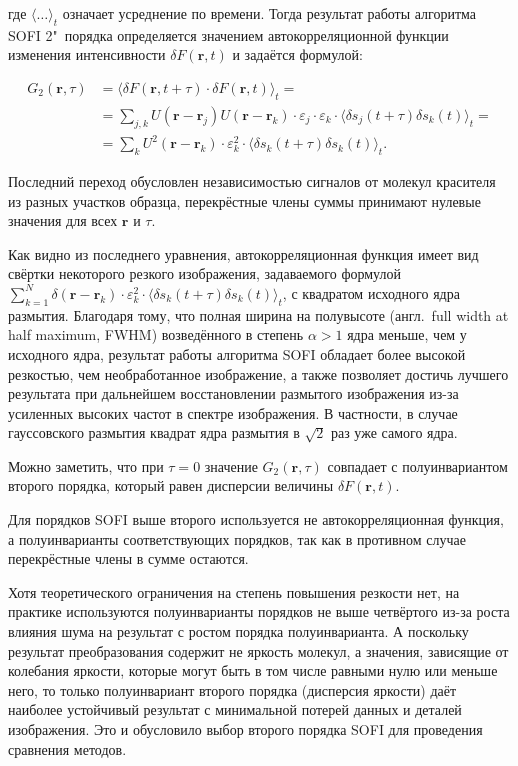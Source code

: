 \noindent где $\langle \ldots \rangle_t$ означает усреднение по времени. Тогда результат работы алгоритма SOFI 2"~порядка определяется значением автокорреляционной функции изменения интенсивности $\delta F\left(\mathbf{r},t\right)$ и задаётся формулой:

\begin{align*}
	G_2\left(\mathbf{r},\tau\right) &= \langle \delta F\left(\mathbf{r},t+\tau\right)\cdot\delta F\left(\mathbf{r},t\right) \rangle_t = \\
	&= \sum_{j,k} {U\left(\mathbf{r}-\mathbf{r}_j\right)U\left(\mathbf{r}-\mathbf{r}_k\right)\cdot\varepsilon_j\cdot\varepsilon_k\cdot \langle \delta s_j\left(t+\tau\right)\delta s_k\left(t\right) \rangle_t} = \\
	&= \sum_{k} {U^2\left(\mathbf{r}-\mathbf{r}_k\right)\cdot\varepsilon_k^2\cdot \langle \delta s_k\left(t+\tau\right)\delta s_k\left(t\right) \rangle_t}.
\end{align*}

Последний переход обусловлен независимостью сигналов от молекул красителя из разных участков образца, перекрёстные члены суммы принимают нулевые значения для всех $\mathbf{r}$ и $\tau$.

Как видно из последнего уравнения, автокорреляционная функция имеет вид свёртки некоторого резкого изображения, задаваемого формулой $\sum_{k=1}^{N} {\delta(\mathbf{r}-\mathbf{r}_k)\cdot\varepsilon_k^2\cdot \langle \delta s_k\left(t+\tau\right)\delta s_k\left(t\right) \rangle_t}$, с квадратом исходного ядра размытия. Благодаря тому, что полная ширина на полувысоте (англ.~full width at half maximum, FWHM) возведённого в степень $\alpha>1$ ядра меньше, чем у исходного ядра, результат работы алгоритма SOFI обладает более высокой резкостью, чем необработанное изображение, а также позволяет достичь лучшего результата при дальнейшем восстановлении размытого изображения из-за усиленных высоких частот в спектре изображения. В частности, в случае гауссовского размытия квадрат ядра размытия в $\sqrt{2}$ раз уже самого ядра.

Можно заметить, что при $\tau=0$ значение $G_2\left(\mathbf{r},\tau\right)$ совпадает с полуинвариантом второго порядка, который равен дисперсии величины $\delta F\left(\mathbf{r},t\right)$.

Для порядков SOFI выше второго используется не автокорреляционная функция, а полуинварианты соответствующих порядков, так как в противном случае перекрёстные члены в сумме остаются.

Хотя теоретического ограничения на степень повышения резкости нет, на практике используются полуинварианты порядков не выше четвёртого из-за роста влияния шума на результат с ростом порядка полуинварианта. А поскольку результат преобразования содержит не яркость молекул, а значения, зависящие от колебания яркости, которые могут быть в том числе равными нулю или меньше него, то только полуинвариант второго порядка (дисперсия яркости) даёт наиболее устойчивый результат с минимальной потерей данных и деталей изображения. Это и обусловило выбор второго порядка SOFI для проведения сравнения методов.

